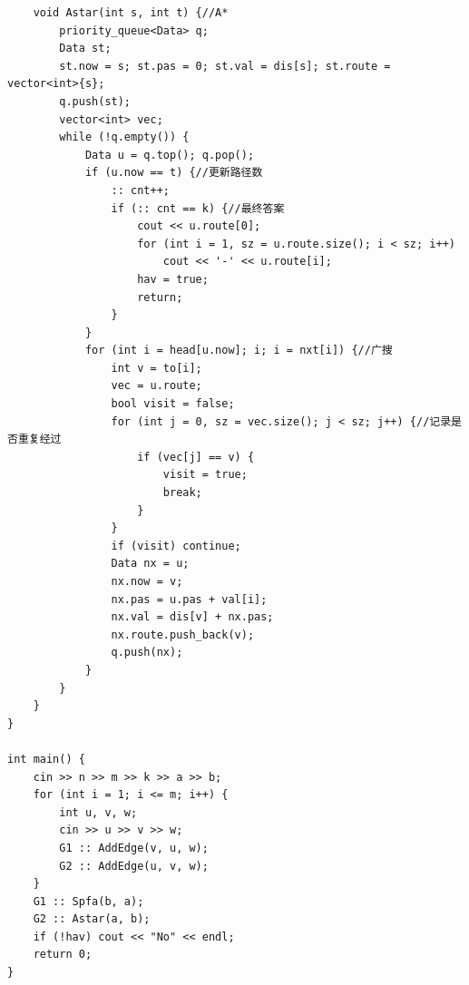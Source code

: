 \documentclass[twoside]{article}
\begin{document}
\begin{lstlisting}
    void Astar(int s, int t) {//A*
        priority_queue<Data> q;
        Data st;
        st.now = s; st.pas = 0; st.val = dis[s]; st.route = vector<int>{s};
        q.push(st);
        vector<int> vec;
        while (!q.empty()) {
            Data u = q.top(); q.pop();
            if (u.now == t) {//更新路径数
                :: cnt++;
                if (:: cnt == k) {//最终答案
                    cout << u.route[0];
                    for (int i = 1, sz = u.route.size(); i < sz; i++)
                        cout << '-' << u.route[i];
                    hav = true;
                    return;
                }
            }
            for (int i = head[u.now]; i; i = nxt[i]) {//广搜
                int v = to[i];
                vec = u.route;
                bool visit = false;
                for (int j = 0, sz = vec.size(); j < sz; j++) {//记录是否重复经过
                    if (vec[j] == v) {
                        visit = true;
                        break;
                    }
                }
                if (visit) continue;
                Data nx = u;
                nx.now = v;
                nx.pas = u.pas + val[i];
                nx.val = dis[v] + nx.pas;
                nx.route.push_back(v);
                q.push(nx);
            }
        }
    }
}

int main() {
    cin >> n >> m >> k >> a >> b;
    for (int i = 1; i <= m; i++) {
        int u, v, w;
        cin >> u >> v >> w;
        G1 :: AddEdge(v, u, w);
        G2 :: AddEdge(u, v, w);
    }
    G1 :: Spfa(b, a);
    G2 :: Astar(a, b);
    if (!hav) cout << "No" << endl;
    return 0;
}\end{lstlisting}
\end{document}
